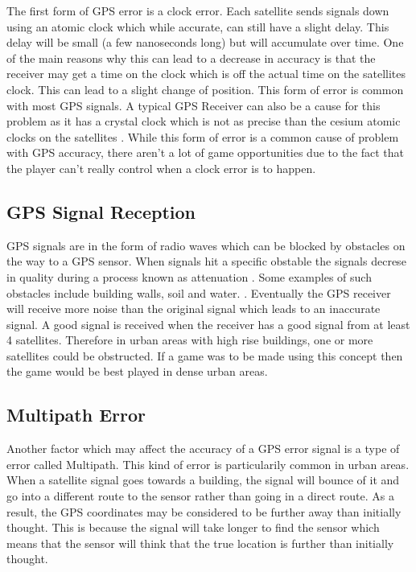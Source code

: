 \documentclass{l4proj}
\begin{document}
The first form of GPS error is a clock error. Each satellite sends signals down using an atomic clock which while accurate, can still have a 
slight delay. This delay will be small (a few nanoseconds long) but will accumulate over time. One of the main reasons why this can lead to
a decrease in accuracy is that the receiver may get a time on the clock which is off the actual time on the satellites clock. This can lead to
a slight change of position. This form of error is common with most GPS signals. A typical GPS Receiver can also be a cause for this problem as it 
has a crystal clock which is not as precise than the cesium atomic clocks on the satellites \citep{Rabbany2006, Kleusberg1990}. While this
form of error is a common cause of problem with GPS accuracy, there aren't a lot of game opportunities due to the fact that the player
can't really control when a clock error is to happen.

\subsection{GPS Signal Reception}
GPS signals are in the form of radio waves which can be blocked by obstacles on the way to a GPS sensor. When signals hit a specific obstable
the signals decrese in quality during a process known as attenuation \citep{Indoor2010}. Some examples of such obstacles include
building walls, soil and water. \citep{Kleusberg1990}. Eventually the GPS receiver will receive more noise
than the original signal which leads to an inaccurate signal. A good signal is received when the receiver has a good signal from at least 4
satellites. Therefore in urban areas with high rise buildings, one or more satellites could be obstructed. If a game was to be made
using this concept then the game would be best played in dense urban areas.

\subsection{Multipath Error}
Another factor which may affect the accuracy of a GPS error signal is a type of error called Multipath. This kind of error is particularily
common in urban areas. When a satellite signal goes towards a building, the signal will bounce of it and go into a different route to the
sensor rather than going in a direct route. As a result, the GPS coordinates may be considered to be further away than initially thought.
This is because the signal will take longer to find the sensor which means that the sensor will think that the true location is further than
initially thought.
\end{document}
